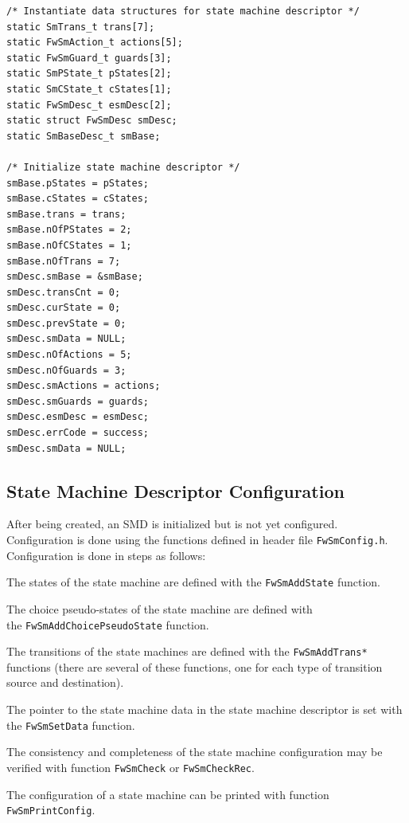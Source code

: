 \documentclass[manual]{../fwprofile}
\begin{document}
\begin{lstlisting}
/* Instantiate data structures for state machine descriptor */
static SmTrans_t trans[7];
static FwSmAction_t actions[5];
static FwSmGuard_t guards[3];
static SmPState_t pStates[2];
static SmCState_t cStates[1];
static FwSmDesc_t esmDesc[2];
static struct FwSmDesc smDesc;
static SmBaseDesc_t smBase;

/* Initialize state machine descriptor */
smBase.pStates = pStates;
smBase.cStates = cStates;
smBase.trans = trans;
smBase.nOfPStates = 2;
smBase.nOfCStates = 1;
smBase.nOfTrans = 7;
smDesc.smBase = &smBase;
smDesc.transCnt = 0;
smDesc.curState = 0;
smDesc.prevState = 0;
smDesc.smData = NULL;
smDesc.nOfActions = 5;
smDesc.nOfGuards = 3;
smDesc.smActions = actions;
smDesc.smGuards = guards;
smDesc.esmDesc = esmDesc;
smDesc.errCode = success;
smDesc.smData = NULL;
\end{lstlisting}

\subsection{State Machine Descriptor Configuration}\label{sec:smConfig}
After being created, an SMD is initialized but is not yet configured. Configuration is done using the functions defined 
in header file \texttt{FwSmConfig.h}. Configuration is done in steps as follows:

\begin{fw_enumerate}
\item The states of the state machine are defined with the \texttt{FwSmAddState} function.  
\item The choice pseudo-states of the state machine are defined with \\ the \texttt{FwSmAddChoicePseudoState} function.
\item The transitions of the state machines are defined with the \texttt{FwSmAddTrans*} functions (there are several 
of these functions, one for each type of transition source and destination).
\item The pointer to the state machine data in the state machine descriptor is set with the \texttt{FwSmSetData} function.
\item The consistency and completeness of the state machine configuration may be verified with function \texttt{FwSmCheck} or \texttt{FwSmCheckRec}. 
\item The configuration of a state machine can be printed with function \\ \texttt{FwSmPrintConfig}.
\end{fw_enumerate}
\end{document}
